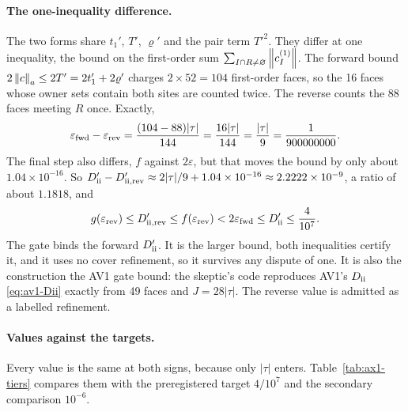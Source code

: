 \paragraph{The one-inequality difference.}
The two forms share $t_1'$, $T'$, $\varrho'$ and the pair term $T'^2$. They
differ at one inequality, the bound on the first-order sum
$\sum_{I\cap R\ne\varnothing}\left\lVert c^{(1)}_I\right\rVert$. The forward bound
$2\left\lVert c\right\rVert_a\le2T'=2t_1'+2\varrho'$ charges $2\times52=104$ first-order faces,
so the 16 faces whose owner sets contain both sites are counted twice. The
reverse counts the 88 faces meeting $R$ once. Exactly,
\begin{equation}
 \varepsilon_{\rm fwd}-\varepsilon_{\rm rev}=\frac{(104-88)|\tau|}{144}
 =\frac{16|\tau|}{144}=\frac{|\tau|}9=\frac1{900000000}.
 \label{eq:ax1-difference}
\end{equation}
The final step also differs, $f$ against $2\varepsilon$, but that moves the
bound by only about $1.04\times10^{-16}$. So
$D'_{\rm ii}-D'_{\rm ii,rev}\approx2|\tau|/9+1.04\times10^{-16}\approx2.2222\times10^{-9}$,
a ratio of about $1.1818$, and
\begin{equation}
 g(\varepsilon_{\rm rev})\le D'_{\rm ii,rev}\le f(\varepsilon_{\rm rev})
 <2\varepsilon_{\rm fwd}\le D'_{\rm ii}\le\frac4{10^7}.
 \label{eq:ax1-ordering}
\end{equation}
The gate binds the forward $D'_{\rm ii}$. It is the larger bound, both
inequalities certify it, and it uses no cover refinement, so it survives any
dispute of one. It is also the construction the AV1 gate bound: the skeptic's
code reproduces AV1's $D_{\rm ii}$ \eqref{eq:av1-Dii} exactly from 49 faces
and $J=28|\tau|$. The reverse value is admitted as a labelled refinement.

\paragraph{Values against the targets.}
Every value is the same at both signs, because only $|\tau|$ enters.
Table~\ref{tab:ax1-tiers} compares them with the preregistered target
$4/10^7$ and the secondary comparison $10^{-6}$.

